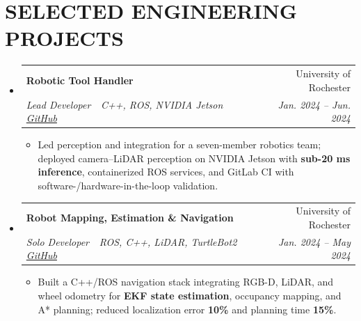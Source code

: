 \documentclass[letterpaper,10pt]{article}
\makeatletter
\newcommand{\resumeItem}[1]{\item {\small #1}}
\newcommand{\resumeSubheading}[4]{
  \item
  \begin{tabular*}{\linewidth}[t]{l@{\extracolsep{\fill}}r}
    \textbf{#1} & {\small #2} \\
    {\small\textit{#3}} & {\small\textit{#4}} \\
  \end{tabular*}
}
\newcommand{\resumeItemListStart}{\begin{itemize}[leftmargin=0.13in,label={\color{cvblue}\textbullet},itemsep=3pt,topsep=3pt,parsep=0pt,partopsep=0pt]}
\newcommand{\resumeItemListEnd}{\end{itemize}}
\newcommand{\resumeSubHeadingListStart}{\begin{itemize}[leftmargin=0in,label={},itemsep=5pt,topsep=0pt,parsep=0pt,partopsep=0pt]}
\newcommand{\resumeSubHeadingListEnd}{\end{itemize}}
\makeatother
\begin{document}
\section{SELECTED ENGINEERING PROJECTS}
\resumeSubHeadingListStart
  \resumeSubheading
    {Robotic Tool Handler}{University of Rochester}
    {Lead Developer \,\textbar\, C++, ROS, NVIDIA Jetson \,\textbar\, \href{https://github.com/haixizhang/Robotic-Tool-Handler}{\textcolor{cvblue}{GitHub}}}{Jan. 2024 -- Jun. 2024}
    \resumeItemListStart
      \resumeItem{Led perception and integration for a seven-member robotics team; deployed camera--LiDAR perception on NVIDIA Jetson with \textbf{sub-20 ms inference}, containerized ROS services, and GitLab CI with software-/hardware-in-the-loop validation.}
    \resumeItemListEnd
  \resumeSubheading
    {Robot Mapping, Estimation \& Navigation}{University of Rochester}
    {Solo Developer \,\textbar\, ROS, C++, LiDAR, TurtleBot2 \,\textbar\, \href{https://github.com/haixizhang/Robot-Mapping-Estimation-Interaction}{\textcolor{cvblue}{GitHub}}}{Jan. 2024 -- May 2024}
    \resumeItemListStart
      \resumeItem{Built a C++/ROS navigation stack integrating RGB-D, LiDAR, and wheel odometry for \textbf{EKF state estimation}, occupancy mapping, and A* planning; reduced localization error \textbf{10\%} and planning time \textbf{15\%}.}
    \resumeItemListEnd
\resumeSubHeadingListEnd
\end{document}
